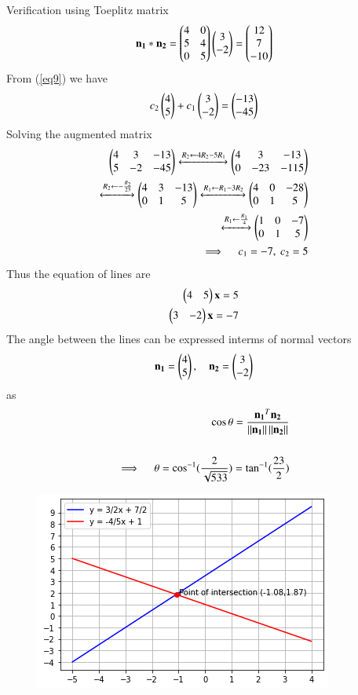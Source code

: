 \documentclass[journal,12pt,twocolumn]{IEEEtran}
\begin{document}
Verification using Toeplitz matrix
\begin{align}
\mathbf{n_1}*\mathbf{n_2}=\begin{pmatrix}4 & 0 \\ 5 & 4 \\0 & 5\end{pmatrix}\begin{pmatrix}3\\-2\end{pmatrix}=\begin{pmatrix}12\\7\\-10\end{pmatrix}
\end{align}
From (\ref{eq9}) we have
\begin{align}
	c_2\begin{pmatrix}4\\5\end{pmatrix}+c_1\begin{pmatrix}3\\-2\end{pmatrix}=\begin{pmatrix}-13\\-45\end{pmatrix}
\end{align}
Solving the augmented matrix
\begin{align}
	\begin{pmatrix}4 & 3 & -13 \\ 5 & -2 & -45\end{pmatrix}
	\xleftrightarrow[]{R_2 \leftarrow 4R_2-5R_1}
	\begin{pmatrix}4 & 3 & -13 \\ 0 & -23 & -115\end{pmatrix}\\
	\xleftrightarrow[]{R_2 \leftarrow -\frac{R_2}{23}}
        \begin{pmatrix}4 & 3 & -13 \\ 0 & 1 & 5\end{pmatrix}
        \xleftrightarrow[]{R_1 \leftarrow R_1-3R_2}
	\begin{pmatrix}4 & 0 & -28 \\ 0 & 1 & 5\end{pmatrix}\\
	\xleftrightarrow[]{R_1 \leftarrow \frac{R_1}{4}}
        \begin{pmatrix}1 & 0 & -7 \\ 0 & 1 & 5\end{pmatrix} \\
	\implies \quad c_1 =-7, \ c_2 =5
\end{align}
Thus the equation of lines are
\begin{align}
	\begin{pmatrix}4 & 5\end{pmatrix}\mathbf{x} = 5 \\
	\begin{pmatrix}3 & -2\end{pmatrix}\mathbf{x} = -7 
\end{align}
The angle between the lines can be expressed interms of normal vectors 
\begin{align}
	\mathbf{n_1}=\begin{pmatrix}4\\5\end{pmatrix} , \quad \mathbf{n_2}=\begin{pmatrix}3\\-2\end{pmatrix}
\end{align}
as
\begin{align}
	\cos\theta=\frac{\mathbf{n_1}^T\mathbf{n_2}}{\left\lVert\mathbf{n_1}\right\rVert\left\lVert\mathbf{n_2}\right\rVert} \\
				\nonumber \\
	\implies \quad \theta=\cos^{-1}({\frac{2}{\sqrt{533}}}) = \tan^{-1}(\frac{23}{2})
\end{align}
\begin{figure}[!h]
	\includegraphics[width=\columnwidth]{lines.png}
	\caption{} \label{linefig1}
\end{figure}
\end{document}
